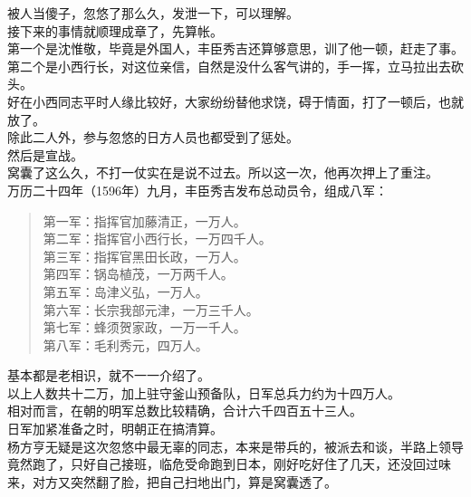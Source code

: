 \begin{multicols}{\theparacolNo}
被人当傻子，忽悠了那么久，发泄一下，可以理解。\\

接下来的事情就顺理成章了，先算帐。\\

第一个是沈惟敬，毕竟是外国人，丰臣秀吉还算够意思，训了他一顿，赶走了事。\\

第二个是小西行长，对这位亲信，自然是没什么客气讲的，手一挥，立马拉出去砍头。\\

好在小西同志平时人缘比较好，大家纷纷替他求饶，碍于情面，打了一顿后，也就放了。\\

除此二人外，参与忽悠的日方人员也都受到了惩处。\\

然后是宣战。\\

窝囊了这么久，不打一仗实在是说不过去。所以这一次，他再次押上了重注。\\

万历二十四年（1596年）九月，丰臣秀吉发布总动员令，组成八军：\\
{\footnotesize \begin{quote}
	第一军：指挥官加藤清正，一万人。\\
	第二军：指挥官小西行长，一万四千人。\\
	第三军：指挥官黑田长政，一万人。\\
	第四军：锅岛植茂，一万两千人。\\
	第五军：岛津义弘，一万人。\\
	第六军：长宗我部元津，一万三千人。\\
	第七军：蜂须贺家政，一万一千人。\\
	第八军：毛利秀元，四万人。\\
\end{quote}}

基本都是老相识，就不一一介绍了。\\

以上人数共十二万，加上驻守釜山预备队，日军总兵力约为十四万人。\\

相对而言，在朝的明军总数比较精确，合计六千四百五十三人。\\

日军加紧准备之时，明朝正在搞清算。\\

杨方亨无疑是这次忽悠中最无辜的同志，本来是带兵的，被派去和谈，半路上领导竟然跑了，只好自己接班，临危受命跑到日本，刚好吃好住了几天，还没回过味来，对方又突然翻了脸，把自己扫地出门，算是窝囊透了。\\


\end{multicols}
